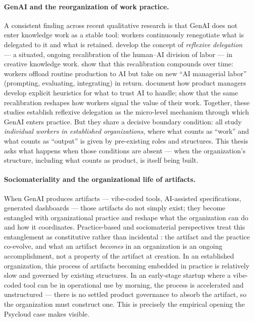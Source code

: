 \documentclass[11pt,a4paper]{article}
\begin{document}
\paragraph{GenAI and the reorganization of work practice.} A consistent finding across recent qualitative research is that GenAI does not enter knowledge work as a stable tool: workers continuously renegotiate what is delegated to it and what is retained. \citet{clarke2025beyond} develop the concept of \emph{reflexive delegation} --- a situated, ongoing recalibration of the human--AI division of labor --- in creative knowledge work. \citet{law2025generative} show that this recalibration compounds over time: workers offload routine production to AI but take on new ``AI managerial labor'' (prompting, evaluating, integrating) in return. \citet{ulloa2025product} document how product managers develop explicit heuristics for what to trust AI to handle; \citet{mayer2025generation} show that the same recalibration reshapes how workers signal the value of their work. Together, these studies establish reflexive delegation as the micro-level mechanism through which GenAI enters practice. But they share a decisive boundary condition: all study \emph{individual workers in established organizations}, where what counts as ``work'' and what counts as ``output'' is given by pre-existing roles and structures. This thesis asks what happens when those conditions are absent --- when the organization's structure, including what counts as product, is itself being built.

\paragraph{Sociomateriality and the organizational life of artifacts.} When GenAI produces artifacts --- vibe-coded tools, AI-assisted specifications, generated dashboards --- those artifacts do not simply exist; they become entangled with organizational practice and reshape what the organization can do and how it coordinates. Practice-based and sociomaterial perspectives treat this entanglement as constitutive rather than incidental \citep{orlikowski2007sociomaterial,leonardi2011flexible}: the artifact and the practice co-evolve, and what an artifact \emph{becomes} in an organization is an ongoing accomplishment, not a property of the artifact at creation. In an established organization, this process of artifacts becoming embedded in practice is relatively slow and governed by existing structures. In an early-stage startup where a vibe-coded tool can be in operational use by morning, the process is accelerated and unstructured --- there is no settled product governance to absorb the artifact, so the organization must construct one. This is precisely the empirical opening the Psycloud case makes visible.
\end{document}
